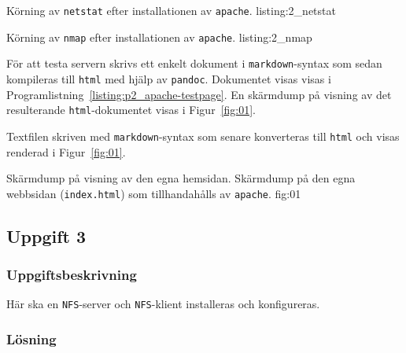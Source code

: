 						{Körning av \texttt{netstat} efter installationen av
					   \texttt{apache}.}
            {listing:2_netstat}

            {Körning av \texttt{nmap} efter installationen av
					   \texttt{apache}.}
            {listing:2_nmap}




För att testa servern skrivs ett enkelt dokument i
\texttt{markdown}\cite{Gruber2013}-syntax som sedan kompileras till
\texttt{html} med hjälp av \texttt{pandoc}\cite{MacFarlane2013}.
Dokumentet visas visas i Programlistning~\ref{listing:p2_apache-testpage}.
En skärmdump på visning av det resulterande \texttt{html}-dokumentet visas i
Figur~\ref{fig:01}.

\begin{listing}[H]
\caption{Textfilen skriven med \texttt{markdown}-syntax som senare konverteras
         till \texttt{html} och visas renderad i Figur~\ref{fig:01}.}
\label{listing:p2_apache-testpage}
\end{listing}

           {Skärmdump på visning av den egna hemsidan.}
           {Skärmdump på den egna webbsidan (\texttt{index.html}) som
            tillhandahålls av \texttt{apache}.}
           {fig:01}



\subsection{Uppgift 3}
\subsubsection{Uppgiftsbeskrivning}
Här ska en \texttt{NFS}-server och \texttt{NFS}-klient installeras och
konfigureras. 


\subsubsection{Lösning}

